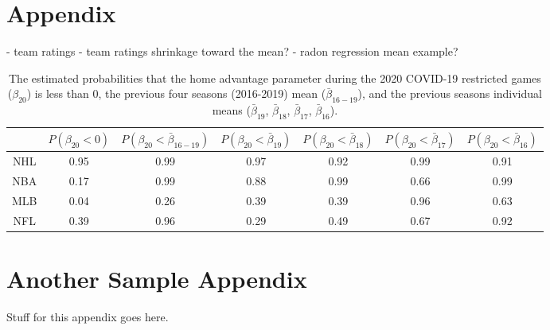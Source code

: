 \documentclass{uofsthesis-cs}
\begin{document}
\begin{appendices}

\chapter{Appendix}

- team ratings
- team ratings shrinkage toward the mean?
- radon regression mean example?

\begin{table}
	\centering
	\begin{tabular}{c@{\hskip0.05in}c@{\hskip0.05in}c@{\hskip 0.05in}c@{\hskip 0.05in}c@{\hskip 0.05in}c@{\hskip 0.05in}c}
		\toprule
		& \boldmath$P(\beta_{20} < 0)$ & \boldmath$P(\beta_{20} < \bar{\beta}_{16-19})$ & \boldmath$P(\beta_{20} < \bar{\beta}_{19})$ & \boldmath$P(\beta_{20} < \bar{\beta}_{18})$ & \boldmath$P(\beta_{20} < \bar{\beta}_{17})$ & \boldmath$P(\beta_{20} < \bar{\beta}_{16})$ \\
		\midrule
		NHL&0.95&0.99&0.97&0.92&0.99&0.91 \\
		\midrule
		NBA&0.17&0.99&0.88&0.99&0.66&0.99 \\
		\midrule
		MLB&0.04&0.26&0.39&0.39&0.96&0.63 \\
		\midrule
		NFL&0.39&0.96&0.29&0.49&0.67&0.92 \\
		\bottomrule
	\end{tabular}
	\caption{The estimated probabilities that the home advantage parameter during the 2020 COVID-19 restricted games ($\beta_{20}$) is less than 0, the previous four seasons (2016-2019) mean ($\bar{\beta}_{16-19}$), and the previous seasons individual means ($\bar{\beta}_{19}$, $\bar{\beta}_{18}$, $\bar{\beta}_{17}$, $\bar{\beta}_{16}$).}\label{tab:ha_probs}
\end{table}

\chapter{Another Sample Appendix}

Stuff for this appendix goes here.

\end{appendices}
\end{document}

